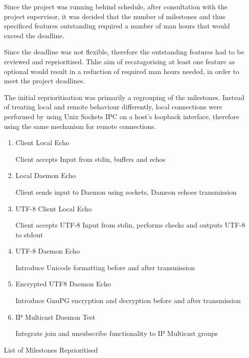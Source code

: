 
Since the project was running behind schedule, after consultation with
the project supervisor, it was decided that the number of milestones and
thus specificed features outstanding required a number of man hours that
would exceed the deadline.


Since the deadline was not flexible, therefore the outstanding
features had to be reviewed and reprioritised. Thhe aim of
recatagorising at least one feature as optional would result in a
reduction of required man hours needed, in order to meet the project
deadlines.


The initial reprioritisation was primarily a regrouping of the
milestones. Instead of treating local and remote behaviour differently,
local connections were performed by using Unix Sockets IPC on a host's
loopback interface, therefore using the same mechanism for remote
connections.

\begin{table}[Hbt]

\begin{center}

\begin{enumerate}

\item Client Local Echo 

	\subitem Client accepts Input from stdin, buffers and echos

\item Local Daemon Echo 

	\subitem Client sends input to Daemon using sockets, Dameon 
	echoes transmission

\item UTF-8 Client Local Echo 

	\subitem Client accepts UTF-8 Input from stdin, performs checks and
	outputs UTF-8 to stdout

\item UTF-8 Daemon Echo

	\subitem Introduce Unicode formatting before and after transmission 

\item Encrypted UTF8 Daemon Echo 

	\subitem Introduce GnuPG encryption and decryption before and after 
	transmission 

\item IP Multicast Daemon Test

	\subitem Integrate join and unsubscribe functionality to IP Multicast
	groups

\end{enumerate}

\end{center}

\caption{List of Milestones Reprioritised}

\end{table}


